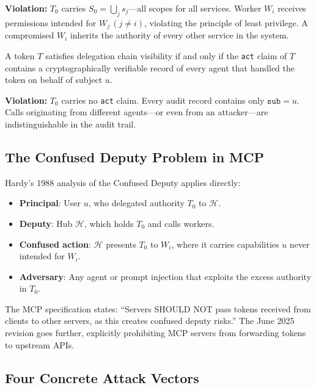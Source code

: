 \documentclass[journal]{IEEEtran}
\begin{document}
\textbf{Violation:} $T_0$ carries $S_0 = \bigcup_j s_j$---all scopes for all
services. Worker $W_i$ receives permissions intended for $W_j\, (j \neq i)$,
violating the principle of least privilege. A compromised $W_i$ inherits the
authority of every other service in the system.

\begin{definition}
A token $T$ satisfies delegation chain visibility if and only if the \texttt{act}
claim of $T$ contains a cryptographically verifiable record of every agent that
handled the token on behalf of subject $u$.
\end{definition}

\textbf{Violation:} $T_0$ carries no \texttt{act} claim. Every audit record
contains only $\texttt{sub} = u$. Calls originating from different agents---or
even from an attacker---are indistinguishable in the audit trail.

\subsection{The Confused Deputy Problem in MCP}

Hardy's 1988 analysis \cite{hardy1988} of the Confused Deputy applies directly:

\begin{itemize}
  \item \textbf{Principal}: User $u$, who delegated authority $T_0$ to $\mathcal{H}$.
  \item \textbf{Deputy}: Hub $\mathcal{H}$, which holds $T_0$ and calls workers.
  \item \textbf{Confused action}: $\mathcal{H}$ presents $T_0$ to $W_i$, where
        it carries capabilities $u$ never intended for $W_i$.
  \item \textbf{Adversary}: Any agent or prompt injection that exploits the
        excess authority in $T_0$.
\end{itemize}

The MCP specification \cite{mcp_security} states: ``Servers SHOULD NOT pass
tokens received from clients to other servers, as this creates confused deputy
risks.'' The June 2025 revision \cite{mcp_spec_2025} goes further, explicitly
prohibiting MCP servers from forwarding tokens to upstream APIs.

\subsection{Four Concrete Attack Vectors}
\end{document}
